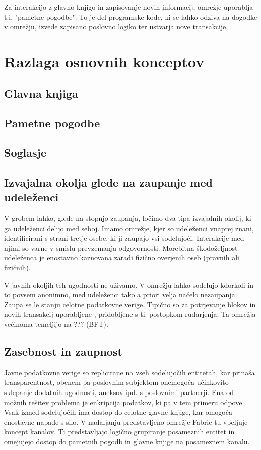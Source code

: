 \documentclass[a4paper, 12pt]{book}
\begin{document}
Za interakcijo z glavno knjigo in zapisovanje novih informacij, omrežje uporablja t.i. "pametne pogodbe". \cite{hyperledgerDocs}
To je del programske kode, ki se lahko odziva na dogodke v omrežju, izvede zapisano poslovno logiko ter ustvarja nove transakcije.\\

\section{Razlaga osnovnih konceptov}

\subsection{Glavna knjiga}

\subsection{Pametne pogodbe}

\subsection{Soglasje}

\subsection{Izvajalna okolja glede na zaupanje med udeleženci}
V grobem lahko, glede na stopnjo zaupanja, ločimo dva tipa izvajalnih okolij, ki ga udeleženci delijo med seboj.
Imamo omrežje, kjer so udeleženci vnaprej znani, identificirani s strani tretje osebe, ki ji zaupajo vsi sodelujoči.
Interakcije med njimi so varne v smislu prevzemanja odgovornosti.
Morebitna škodoželjnost udeleženca je enostavno kaznovana zaradi fizično overjenih oseb (pravnih ali fizičnih).

V javnih okoljih teh ugodnosti ne uživamo.
V omrežju lahko sodelujo kdorkoli in to povsem anonimno,
med udeleženci tako a priori velja načelo nezaupanja.
Zaupa se le stanju celotne podatkovne verige.
Tipično so za potrjevanje blokov in novih transakcij uporabljene , pridobljene s ti. postopkom rudarjenja.
Ta omrežja večinoma temeljijo na ??? (BFT). \cite{hyperledgerDocs}

\subsection{Zasebnost in zaupnost}
Javne podatkovne verige so replicirane na vseh sodelujočih entitetah, kar prinaša transparentnost, obenem pa poslovnim subjektom onemogoča učinkovito sklepanje dodatnih ugodnosti, aneksov ipd. s poslovnimi partnerji.
Ena od možnih rešitev problema je enkripcija podatkov, ki pa v tem primeru odpove.
Vsak izmed sodelujočih ima dostop do celotne glavne knjige, kar omogoča enostavne napade s silo.
V nadaljanju predstavljeno omrežje Fabric tu vpeljuje koncept kanalov.
Ti predstavljajo logično grupiranje posameznih entitet in omejujejo dostop do pametnih pogodb in glavne knjige na posameznem kanalu. \cite{hyperledgerDocs}
\end{document}
